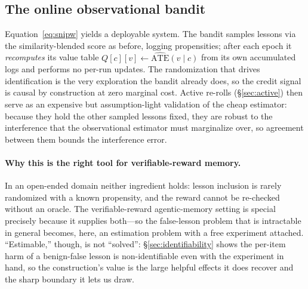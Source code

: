 \subsection{The online observational bandit}\label{sec:onl}
Equation~\ref{eq:snipw} yields a deployable system. The bandit samples lessons via the
similarity-blended score as before, logging propensities; after each epoch it
\emph{recomputes} its value table $Q[c][v]\leftarrow\widehat{\mathrm{ATE}}(v\mid c)$
from its own accumulated logs and performs no per-run updates. The randomization that
drives identification is the very exploration the bandit already does, so the credit
signal is causal by construction at zero marginal cost. Active re-rolls
(\S\ref{sec:active}) then serve as an expensive but assumption-light validation of
the cheap estimator: because they hold the other sampled lessons fixed, they are
robust to the interference that the observational estimator must marginalize over,
so agreement between them bounds the interference error.

\paragraph{Why this is the right tool for verifiable-reward memory.} In an
open-ended domain neither ingredient holds: lesson inclusion is rarely randomized
with a known propensity, and the reward cannot be re-checked without an oracle. The
verifiable-reward agentic-memory setting is special precisely because it supplies
both---so the false-lesson problem that is intractable in general becomes, here, an
estimation problem with a free experiment attached. ``Estimable,'' though, is not
``solved'': \S\ref{sec:identifiability} shows the per-item harm of a benign-false lesson
is non-identifiable even with the experiment in hand, so the construction's value is the
large helpful effects it does recover and the sharp boundary it lets us draw.
